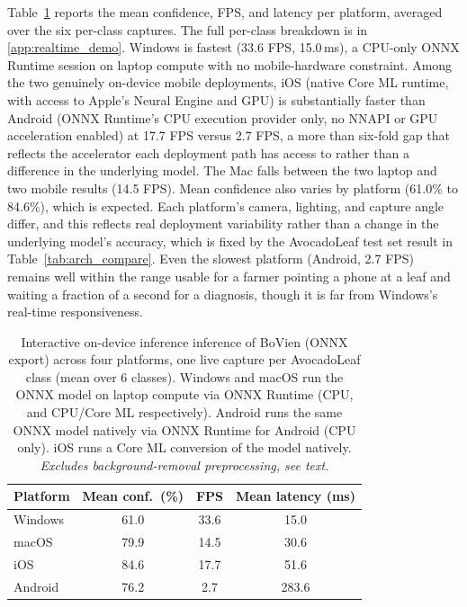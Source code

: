 Table~\ref{tab:realtime_demo} reports the mean confidence, FPS, and latency per platform, averaged over the six per-class captures. The full per-class breakdown is in \ref{app:realtime_demo}. Windows is fastest (33.6 FPS, 15.0\,ms), a CPU-only ONNX Runtime session on laptop compute with no mobile-hardware constraint. Among the two genuinely on-device mobile deployments, iOS (native Core ML runtime, with access to Apple's Neural Engine and GPU) is substantially faster than Android (ONNX Runtime's CPU execution provider only, no NNAPI or GPU acceleration enabled) at 17.7 FPS versus 2.7 FPS, a more than six-fold gap that reflects the accelerator each deployment path has access to rather than a difference in the underlying model. The Mac falls between the two laptop and two mobile results (14.5 FPS). Mean confidence also varies by platform (61.0\% to 84.6\%), which is expected. Each platform's camera, lighting, and capture angle differ, and this reflects real deployment variability rather than a change in the underlying model's accuracy, which is fixed by the AvocadoLeaf test set result in Table~\ref{tab:arch_compare}. Even the slowest platform (Android, 2.7 FPS) remains well within the range usable for a farmer pointing a phone at a leaf and waiting a fraction of a second for a diagnosis, though it is far from Windows's real-time responsiveness.

\begin{table}[htbp]
\centering
\caption{Interactive on-device inference  inference of BoVien (ONNX export) across four platforms, one live capture per AvocadoLeaf class (mean over 6 classes). Windows and macOS run the ONNX model on laptop compute via ONNX Runtime (CPU, and CPU/Core ML respectively). Android runs the same ONNX model natively via ONNX Runtime for Android (CPU only). iOS runs a Core ML conversion of the model natively. \emph{Excludes background-removal preprocessing, see text.}}
\label{tab:realtime_demo}
\small
\setlength{\tabcolsep}{4pt}
\begin{tabular}{lccc}
\toprule
\textbf{Platform} & \textbf{Mean conf.\ (\%)} & \textbf{FPS} & \textbf{Mean latency (ms)} \\
\midrule
Windows & 61.0 & 33.6 & 15.0 \\
macOS   & 79.9 & 14.5 & 30.6 \\
iOS     & 84.6 & 17.7 & 51.6 \\
Android & 76.2 & 2.7  & 283.6 \\
\bottomrule
\end{tabular}
\end{table}
